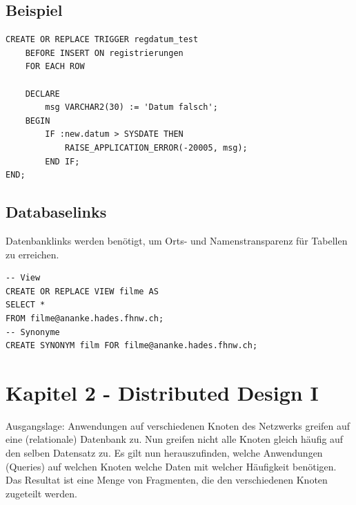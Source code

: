 \documentclass[a4paper,11pt]{article}
\begin{document}
\subsection{Beispiel}
\begin{lstlisting}[style=sql, title=Trigger]
CREATE OR REPLACE TRIGGER regdatum_test
	BEFORE INSERT ON registrierungen
	FOR EACH ROW
	
	DECLARE
		msg VARCHAR2(30) := 'Datum falsch';
	BEGIN
		IF :new.datum > SYSDATE THEN
			RAISE_APPLICATION_ERROR(-20005, msg);
		END IF;
END;
\end{lstlisting}
\subsection{Databaselinks}
Datenbanklinks werden benötigt, um Orts- und Namenstransparenz für Tabellen zu erreichen.
\begin{lstlisting}[style=sql, title=Databaselinks]
-- View
CREATE OR REPLACE VIEW filme AS
SELECT *
FROM filme@ananke.hades.fhnw.ch;
-- Synonyme
CREATE SYNONYM film FOR filme@ananke.hades.fhnw.ch;
\end{lstlisting}
\section{Kapitel 2 - Distributed Design I}
Ausgangslage: Anwendungen auf verschiedenen Knoten des Netzwerks greifen auf eine (relationale) Datenbank zu. Nun greifen nicht alle Knoten gleich häufig auf den selben Datensatz zu. Es gilt nun herauszufinden, welche Anwendungen (Queries) auf welchen Knoten welche Daten mit welcher Häufigkeit benötigen. Das Resultat ist eine Menge von Fragmenten, die den verschiedenen Knoten zugeteilt werden.
\end{document}
